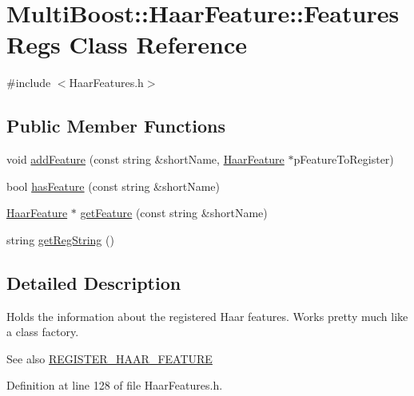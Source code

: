 \hypertarget{classMultiBoost_1_1HaarFeature_1_1FeaturesRegs}{
\section{MultiBoost::HaarFeature::FeaturesRegs Class Reference}
\label{classMultiBoost_1_1HaarFeature_1_1FeaturesRegs}
}


{\ttfamily \#include $<$HaarFeatures.h$>$}

\subsection*{Public Member Functions}
\begin{DoxyCompactItemize}
\item 
void \hyperlink{classMultiBoost_1_1HaarFeature_1_1FeaturesRegs_a23dec729a5b9e7e4fdbc1ea3eeb3d5e8}{addFeature} (const string \&shortName, \hyperlink{classMultiBoost_1_1HaarFeature}{HaarFeature} $\ast$pFeatureToRegister)
\item 
bool \hyperlink{classMultiBoost_1_1HaarFeature_1_1FeaturesRegs_a0d6b0b4a000a5763c32f137aef483593}{hasFeature} (const string \&shortName)
\item 
\hyperlink{classMultiBoost_1_1HaarFeature}{HaarFeature} $\ast$ \hyperlink{classMultiBoost_1_1HaarFeature_1_1FeaturesRegs_aabf4b0ffdcaa11b508bff0d4d59cc839}{getFeature} (const string \&shortName)
\item 
string \hyperlink{classMultiBoost_1_1HaarFeature_1_1FeaturesRegs_a68f555cd74a8f2abc8c85943a2b2c87b}{getRegString} ()
\end{DoxyCompactItemize}


\subsection{Detailed Description}
Holds the information about the registered Haar features. Works pretty much like a class factory. \begin{DoxySeeAlso}{See also}
\hyperlink{HaarFeatures_8h_adcc549bcab1fba9c2649737e60dd50ea}{REGISTER\_\-HAAR\_\-FEATURE} 
\end{DoxySeeAlso}


Definition at line 128 of file HaarFeatures.h.



